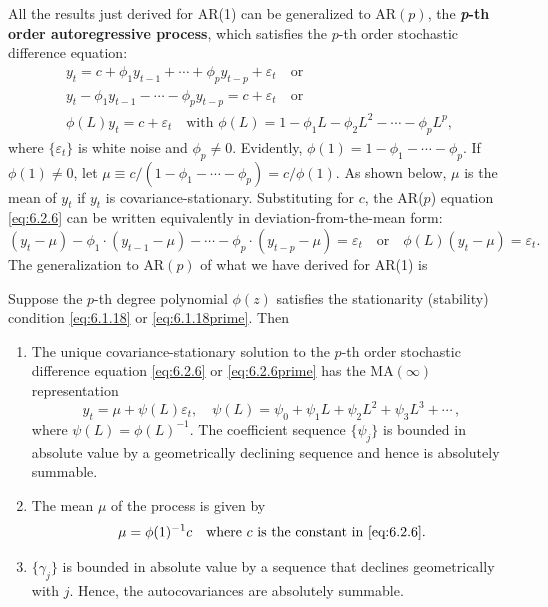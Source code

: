 All the results just derived for AR(1) can be generalized to $\text{AR}(p)$, the \textbf{\textit{p}-th
order autoregressive process}, which satisfies the $p$-th order stochastic difference
equation:
\begin{equation}
\begin{gathered}
  y_t = c + \phi_1 y_{t-1} + \cdots + \phi_p y_{t-p} + \varepsilon_t \quad \text{or} \\
  y_t - \phi_1 y_{t-1} - \cdots - \phi_p y_{t-p} = c + \varepsilon_t \quad \text{or} \\
  \phi(L) y_t = c + \varepsilon_t \quad \text{with } \phi(L) = 1 - \phi_1 L - \phi_2 L^2 - \cdots - \phi_p L^p,
\end{gathered}
\label{eq:6.2.6}
\end{equation}
where $\{\varepsilon_t\}$ is white noise and $\phi_p \neq 0$. Evidently, $\phi(1) = 1 - \phi_1 - \cdots - \phi_p$. If
$\phi(1) \neq 0$, let $\mu \equiv c/(1 - \phi_1 - \cdots - \phi_p) = c/\phi(1)$. As shown below, $\mu$ is the
mean of $y_t$ if $y_t$ is covariance-stationary. Substituting for $c$, the AR($p$) equation
\eqref{eq:6.2.6} can be written equivalently in deviation-from-the-mean form:
\begin{equation}
  (y_t - \mu) - \phi_1 \cdot (y_{t-1} - \mu) - \cdots - \phi_p \cdot (y_{t-p} - \mu) = \varepsilon_t
  \quad \text{or} \quad \phi(L)(y_t - \mu) = \varepsilon_t.
  \label{eq:6.2.6prime}
  \tag{6.2.6$'$}
\end{equation}
The generalization to $\text{AR}(p)$ of what we have derived for AR(1) is

\begin{proposition}
\label{prop:6.4}
Suppose the $p$-th degree polynomial $\phi(z)$ satisfies the stationarity (stability) condition
\eqref{eq:6.1.18} or \eqref{eq:6.1.18prime}. Then
\begin{enumerate}[label=(\alph*)]
\item The unique covariance-stationary solution to the $p$-th order stochastic difference
equation \eqref{eq:6.2.6} or \eqref{eq:6.2.6prime} has the $\mathrm{MA}(\infty)$ representation
\begin{equation}
  y_t = \mu + \psi(L) \varepsilon_t, \quad
  \psi(L) = \psi_0 + \psi_1 L + \psi_2 L^2 + \psi_3 L^3 + \cdots\,,
  \label{eq:6.2.7}
\end{equation}
where $\psi(L) = \phi(L)^{-1}$. The coefficient sequence $\{\psi_j\}$ is bounded in absolute
value by a geometrically declining sequence and hence is absolutely summable.

\item The mean $\mu$ of the process is given by
\begin{equation}
  \mu = \phi(1)^{-1} c \quad \text{where $c$ is the constant in \eqref{eq:6.2.6}.}
  \label{eq:6.2.8}
\end{equation}

\item $\{\gamma_j\}$ is bounded in absolute value by a sequence that declines geometrically
with $j$. Hence, the autocovariances are absolutely summable.
\end{enumerate}
\end{proposition}

